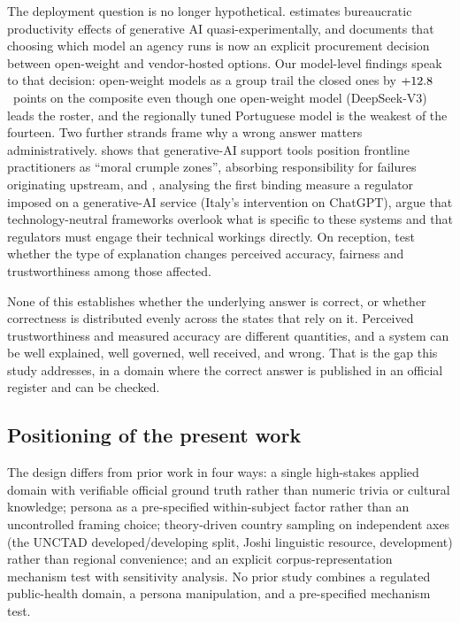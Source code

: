 The deployment question is no longer hypothetical. \citet{kim2026genai}
estimates bureaucratic productivity effects of generative AI
quasi-experimentally, and \citet{robinson2026opensource} documents that choosing
which model an agency runs is now an explicit procurement decision between
open-weight and vendor-hosted options. Our model-level findings speak to that
decision: open-weight models as a group trail the closed ones by
$+12.8$~points on the composite even though one open-weight model
(DeepSeek-V3) leads the roster, and the regionally tuned Portuguese model is the
weakest of the fourteen. Two further strands frame why a wrong answer matters
administratively. \citet{choroszewicz2026crumple} shows that generative-AI
support tools position frontline practitioners as ``moral crumple zones'',
absorbing responsibility for failures originating upstream, and
\citet{cordella2024regulating}, analysing the first binding measure a regulator
imposed on a generative-AI service (Italy's intervention on ChatGPT), argue that
technology-neutral frameworks overlook what is specific to these systems and
that regulators must engage their technical workings directly. On reception,
\citet{aoki2024explainable} test whether the type of explanation changes
perceived accuracy, fairness and trustworthiness among those affected.

None of this establishes whether the underlying answer is correct, or whether
correctness is distributed evenly across the states that rely on it. Perceived
trustworthiness and measured accuracy are different quantities, and a system can
be well explained, well governed, well received, and wrong. That is the gap this
study addresses, in a domain where the correct answer is published in an
official register and can be checked.

\subsection{Positioning of the present work}

The design differs from prior work in four ways: a single high-stakes applied
domain with verifiable official ground truth rather than numeric trivia or
cultural knowledge; persona as a pre-specified within-subject factor rather than
an uncontrolled framing choice; theory-driven country sampling on independent
axes (the UNCTAD developed/developing split, Joshi linguistic resource,
development) rather than regional convenience; and an explicit
corpus-representation mechanism test with sensitivity analysis. No prior study
combines a regulated public-health domain, a persona manipulation, and a
pre-specified mechanism test.
